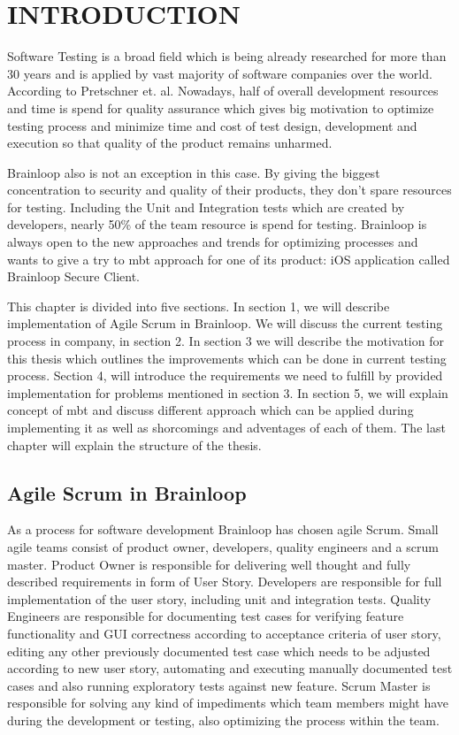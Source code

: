 \chapter{INTRODUCTION}
\label{chapter:introduction}

Software Testing is a broad field which is being already researched for more than 30 years and is applied by vast majority of software companies over the world. According to Pretschner et. al. Nowadays, half of overall development resources and time is spend for quality assurance which gives big motivation to optimize testing process and minimize time and cost of test design, development and execution so that quality of the product remains unharmed.

Brainloop also is not an exception in this case. By giving the biggest concentration to security and quality of their products, they don't spare resources for testing. Including the Unit and Integration tests which are created by developers, nearly 50\% of the team resource is spend for testing. Brainloop is always open to the new approaches and trends for optimizing processes and wants to give a try to \acrlong{mbt} approach for one of its product: iOS application called Brainloop Secure Client.

This chapter is divided into five sections. In section 1, we will describe implementation of Agile Scrum in Brainloop. We will discuss the current testing process in company, in section 2. In section 3 we will describe the motivation for this thesis which outlines the improvements which can be done in current testing process. Section 4, will introduce the requirements we need to fulfill by provided implementation for problems mentioned in section 3. In section 5, we will explain concept of \acrlong{mbt} and discuss different approach which can be applied during implementing it as well as shorcomings and adventages of each of them. The last chapter will explain the structure of the thesis.

\section{Agile Scrum in Brainloop}

As a process for software development Brainloop has chosen agile Scrum. Small agile teams consist of product owner, developers, quality engineers and a scrum master. Product Owner is responsible for delivering well thought and fully described requirements in form of User Story. Developers are responsible for full implementation of the user story, including unit and integration tests. Quality Engineers are responsible for documenting test cases for verifying feature functionality and GUI correctness according to acceptance criteria of user story, editing any other previously documented test case which needs to be adjusted according to new user story, automating and executing manually documented test cases and also running exploratory tests against new feature. Scrum Master is responsible for solving any kind of impediments which team members might have during the development or testing, also optimizing the process within the team.

